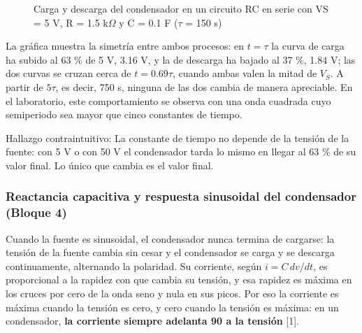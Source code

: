 \documentclass[11pt,letterpaper]{article}
\begin{document}
\begin{figure}[H]
  \caption{Carga y descarga del condensador en un circuito RC en serie con VS = 5 V, R = 1.5 k\ensuremath{\Omega} y C = 0.1 \textmu{}F (\ensuremath{\tau} = 150 \textmu{}s)}
\end{figure}

La gráfica muestra la simetría entre ambos procesos: en $t = \tau$ la curva de carga ha subido al 63 \% de 5 V, 3.16 V, y la de descarga ha bajado al 37 \%, 1.84 V; las dos curvas se cruzan cerca de $t = 0.69\tau$, cuando ambas valen la mitad de $V_S$. A partir de $5\tau$, es decir, 750 \textmu{}s, ninguna de las dos cambia de manera apreciable. En el laboratorio, este comportamiento se observa con una onda cuadrada cuyo semiperiodo sea mayor que cinco constantes de tiempo.

\begin{nota}{Hallazgo contraintuitivo:}
La constante de tiempo no depende de la tensión de la fuente: con 5 V o con 50 V el condensador tarda lo mismo en llegar al 63 \% de su valor final. Lo único que cambia es el valor final.
\end{nota}

\subsubsection{Reactancia capacitiva y respuesta sinusoidal del condensador (Bloque 4)}

Cuando la fuente es sinusoidal, el condensador nunca termina de cargarse: la tensión de la fuente cambia sin cesar y el condensador se carga y se descarga continuamente, alternando la polaridad. Su corriente, según $i = C\,dv/dt$, es proporcional a la rapidez con que cambia su tensión, y esa rapidez es máxima en los cruces por cero de la onda seno y nula en sus picos. Por eso la corriente es máxima cuando la tensión es cero, y cero cuando la tensión es máxima: en un condensador, \textbf{la corriente siempre adelanta 90\textdegree{} a la tensión} [1].
\end{document}
